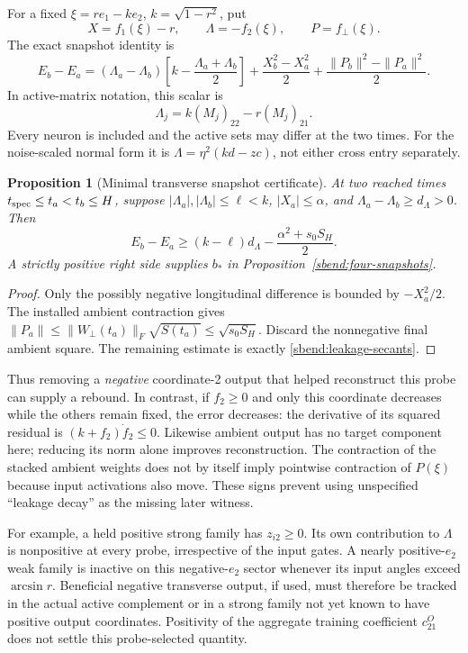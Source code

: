 \documentclass[11pt]{article}
\newtheorem{proposition}[theorem]{Proposition}
\theoremstyle{remark}
\begin{document}
For a fixed $\xi=re_1-ke_2$, $k=\sqrt{1-r^2}$, put
\[
 X=f_1(\xi)-r,\qquad \Lambda=-f_2(\xi),\qquad P=f_\perp(\xi).
\]
The exact snapshot identity is
\begin{equation}\label{sbend:leakage-secants}
 E_b-E_a=(\Lambda_a-\Lambda_b)
          \left[k-\frac{\Lambda_a+\Lambda_b}{2}\right]
       +\frac{X_b^2-X_a^2}{2}
       +\frac{\|P_b\|^2-\|P_a\|^2}{2}.
\end{equation}
In active-matrix notation, this scalar is
\[
 \Lambda_j=k(M_j)_{22}-r(M_j)_{21}.
\]
Every neuron is included and the active sets may differ at the two times.
For the noise-scaled normal form it is
$\Lambda=\eta^2(kd-zc)$, not either cross entry separately.

\begin{proposition}[Minimal transverse snapshot certificate]
\label{sbend:leakage-certificate}
At two reached times $t_{\rm spec}\le t_a<t_b\le H$, suppose
$|\Lambda_a|,|\Lambda_b|\le\ell<k$, $|X_a|\le\alpha$, and
$\Lambda_a-\Lambda_b\ge d_\Lambda>0$. Then
\begin{equation}\label{sbend:leakage-budget}
 E_b-E_a\ge (k-\ell)d_\Lambda
                          -\frac{\alpha^2+s_0S_H}{2}.
\end{equation}
A strictly positive right side supplies $b_*$ in
Proposition~\ref{sbend:four-snapshots}.
\end{proposition}
\begin{proof}
Only the possibly negative longitudinal difference is bounded by
$-X_a^2/2$. The installed ambient contraction gives
$\|P_a\|\le\|W_\perp(t_a)\|_F\sqrt{S(t_a)}
\le\sqrt{s_0S_H}$. Discard the nonnegative final ambient square.
The remaining estimate is exactly \eqref{sbend:leakage-secants}.
\end{proof}

Thus removing a \emph{negative} coordinate-2 output that helped reconstruct
this probe can supply a rebound. In contrast, if $f_2\ge0$ and only this
coordinate decreases while the others remain fixed, the error decreases:
the derivative of its squared residual is $(k+f_2)\dot f_2\le0$.
Likewise ambient output has no target component here; reducing its norm
alone improves reconstruction. The contraction of the stacked ambient
weights does not by itself imply pointwise contraction of $P(\xi)$ because
input activations also move. These signs prevent using unspecified
``leakage decay'' as the missing later witness.

For example, a held positive strong family has $z_{i2}\ge0$. Its own
contribution to $\Lambda$ is nonpositive at every probe, irrespective of
the input gates. A nearly positive-$e_2$ weak family is inactive on this
negative-$e_2$ sector whenever its input angles exceed $\arcsin r$.
Beneficial negative transverse output, if used, must therefore be tracked
in the actual active complement or in a strong family not yet known to
have positive output coordinates. Positivity of the aggregate training
coefficient $c_{21}^O$ does not settle this probe-selected quantity.
\end{document}
